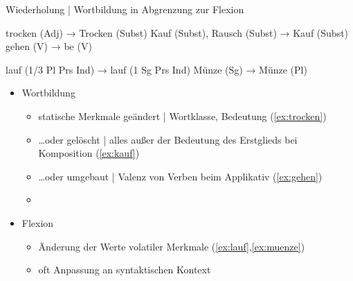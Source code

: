 \begin{frame}
  {Wiederholung | Wortbildung in Abgrenzung zur Flexion}
  \pause
  \begin{exe}
    \ex
    \begin{xlist}
      \ex trocken (Adj) → \alert{Trocken} (Subst)\label{ex:trocken}
      \ex Kauf (Subst), Rausch (Subst) → \alert{Kauf} (Subst)\label{ex:kauf}
      \ex gehen (V) → \alert{be} (V)\label{ex:gehen}
    \end{xlist}
    \pause
    \ex
    \begin{xlist}
      \ex \alert{lauf} (1\slash 3 Pl Prs Ind) → \alert{lauf} (1 Sg Prs Ind)\label{ex:lauf}
      \ex \alert{Münze} (Sg) → \alert{Münze} (Pl)\label{ex:muenze}
    \end{xlist}
  \end{exe}
  \pause
  \Halbzeile
  \begin{itemize}[<+->]
    \item Wortbildung
      \begin{itemize}[<+->]
        \item statische Merkmale geändert | Wortklasse, Bedeutung \alert{(\ref{ex:trocken})}
        \item \ldots oder gelöscht | alles außer der Bedeutung des Erstglieds bei Komposition \alert{(\ref{ex:kauf})}
        \item \ldots oder umgebaut | Valenz von Verben beim Applikativ \alert{(\ref{ex:gehen})}
        \item {}
      \end{itemize}
  \Halbzeile
    \item Flexion
      \begin{itemize}
        \item Änderung der Werte volatiler Merkmale \alert{(\ref{ex:lauf},\ref{ex:muenze})}
        \item \alert{oft Anpassung an syntaktischen Kontext}
      \end{itemize}
  \end{itemize}
\end{frame}



